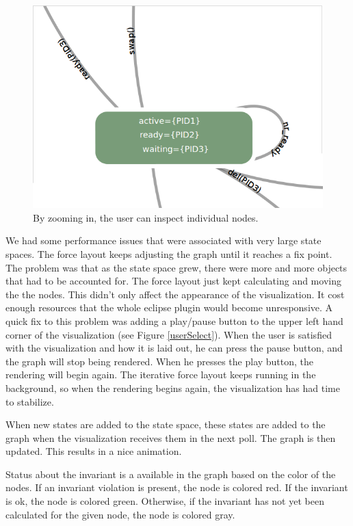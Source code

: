 \begin{center}
\begin{figure}[h!]
\centering
\includegraphics[width=14cm]{bilder/onestate.png}
\caption{By zooming in, the user can inspect individual nodes.}
\label{onestate}
\end{figure}
\end{center}

We had some performance issues that were associated with very large state spaces. The force layout keeps adjusting the graph until it reaches a fix point. The problem was that as the state space grew, there were more and more objects that had to be accounted for. The force layout just kept calculating and moving the the nodes. This didn't only affect the appearance of the visualization. It cost enough resources that the whole eclipse plugin would become unresponsive. A quick fix to this problem was adding a play/pause button to the upper left hand corner of the visualization (see Figure \ref{userSelect}). When the user is satisfied with the visualization and how it is laid out, he can press the pause button, and the graph will stop being rendered. When he presses the play button, the rendering will begin again. The iterative force layout keeps running in the background, so when the rendering begins again, the visualization has had time to stabilize.

When new states are added to the state space, these states are added to the graph when the visualization receives them in the next poll. The graph is then updated. This results in a nice animation.

Status about the invariant is a available in the graph based on the color of the nodes. If an invariant violation is present, the node is colored red. If the invariant is ok, the node is colored green. Otherwise, if the invariant has not yet been calculated for the given node, the node is colored gray.

